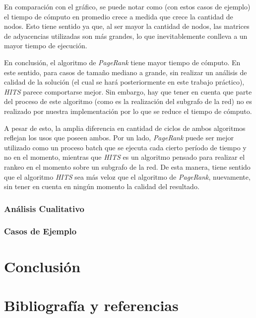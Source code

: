 En comparación con el gráfico, se puede notar como (con estos casos de ejemplo) el tiempo de cómputo en promedio crece a medida que crece la cantidad de nodos. Esto tiene sentido ya que, al ser mayor la cantidad de nodos, las matrices de adyacencias utilizadas son más grandes, lo que inevitablemente conlleva a un mayor tiempo de ejecución.

\par 

En conclusión, el algoritmo de \textit{PageRank} tiene mayor tiempo de cómputo. En este sentido, para casos de tamaño mediano a grande, sin realizar un análisis de calidad de la solución (el cual se hará posteriormente en este trabajo práctico), \textit{HITS} parece comportarse mejor. Sin embargo, hay que tener en cuenta que parte del proceso de este algoritmo (como es la realización del subgrafo de la red) no es realizado por nuestra implementación por lo que se reduce el tiempo de cómputo. 
\par A pesar de esto, la amplia diferencia en cantidad de ciclos de ambos algoritmos reflejan los usos que poseen ambos. Por un lado, \textit{PageRank} puede ser mejor utilizado como un proceso batch que se ejecuta cada cierto período de tiempo y no en el momento, mientras que \textit{HITS} es un algoritmo pensado para realizar el rankeo en el momento sobre un subgrafo de la red. De esta manera, tiene sentido que el algoritmo \textit{HITS} sea más veloz que el algoritmo de \textit{PageRank}, nuevamente, sin tener en cuenta en ningún momento la calidad del resultado.



\subsubsection{Análisis Cualitativo}

\subsubsection{Casos de Ejemplo}
	
	
\section{Conclusión}


\section{Bibliografía y referencias} %


